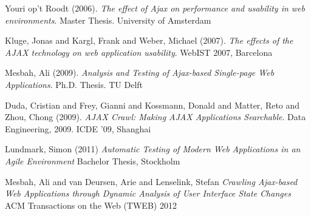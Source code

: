 \documentclass[f,bachelor,binding,twoside,palatino]{WeSTthesis}
\begin{document}
\printglossary

\begin{thebibliography}{9}

  Youri op't Roodt (2006).
  \emph{The effect of Ajax on performance and usability in web environments}.
  Master Thesis. University of Amsterdam

  Kluge, Jonas and Kargl, Frank and Weber, Michael (2007).
  \emph{The effects of the AJAX technology on web application usability}.
  WebIST 2007, Barcelona

  Mesbah, Ali (2009).
  \emph{Analysis and Testing of Ajax-based Single-page Web Applications}.
  Ph.D. Thesis. TU Delft

  Duda, Cristian and Frey, Gianni and Kossmann, Donald and Matter, Reto and Zhou, Chong (2009).
  \emph{AJAX Crawl: Making AJAX Applications Searchable}.
  Data Engineering, 2009. ICDE '09, Shanghai
  
  Lundmark, Simon (2011)
  \emph{Automatic Testing of Modern Web Applications in an Agile Environment}
  Bachelor Thesis, Stockholm

  Mesbah, Ali and van Deursen, Arie and Lenselink, Stefan
  \emph{Crawling {Ajax}-based Web Applications through Dynamic Analysis of User Interface State Changes}
  ACM Transactions on the Web (TWEB) 2012
  
\end{thebibliography}
\end{document}
